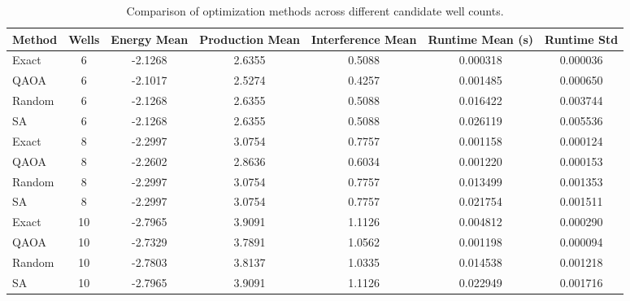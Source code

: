 \begin{table}[H]
\centering
\caption{Comparison of optimization methods across different candidate well counts.}
\label{tab:benchmark_comparison}
\begin{tabular}{lcccccc}
\toprule
Method & Wells & Energy Mean & Production Mean & Interference Mean & Runtime Mean (s) & Runtime Std \\
\midrule
Exact & 6 & -2.1268 & 2.6355 & 0.5088 & 0.000318 & 0.000036 \\
QAOA & 6 & -2.1017 & 2.5274 & 0.4257 & 0.001485 & 0.000650 \\
Random & 6 & -2.1268 & 2.6355 & 0.5088 & 0.016422 & 0.003744 \\
SA & 6 & -2.1268 & 2.6355 & 0.5088 & 0.026119 & 0.005536 \\
Exact & 8 & -2.2997 & 3.0754 & 0.7757 & 0.001158 & 0.000124 \\
QAOA & 8 & -2.2602 & 2.8636 & 0.6034 & 0.001220 & 0.000153 \\
Random & 8 & -2.2997 & 3.0754 & 0.7757 & 0.013499 & 0.001353 \\
SA & 8 & -2.2997 & 3.0754 & 0.7757 & 0.021754 & 0.001511 \\
Exact & 10 & -2.7965 & 3.9091 & 1.1126 & 0.004812 & 0.000290 \\
QAOA & 10 & -2.7329 & 3.7891 & 1.0562 & 0.001198 & 0.000094 \\
Random & 10 & -2.7803 & 3.8137 & 1.0335 & 0.014538 & 0.001218 \\
SA & 10 & -2.7965 & 3.9091 & 1.1126 & 0.022949 & 0.001716 \\
\bottomrule
\end{tabular}
\end{table}